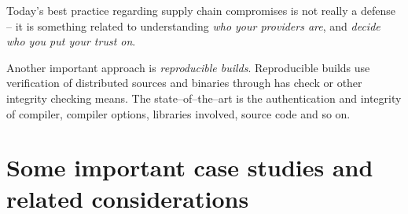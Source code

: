 \documentclass[10pt]{extbook}
\begin{document}
Today's best practice regarding supply chain compromises is not really a
defense -- it is something related to understanding \emph{who your providers
are}, and \emph{decide who you put your trust on}.

Another important approach is \emph{reproducible builds}. Reproducible builds
use verification of distributed sources and binaries through has check or other
integrity checking means. The state--of--the--art is the authentication and
integrity of compiler, compiler options, libraries involved, source code and so
on.

\chapter{Some important case studies and related considerations}
\end{document}
